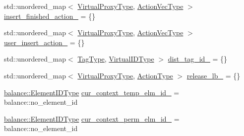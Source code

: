 \begin{DoxyCompactItemize}
\item 
std\+::unordered\+\_\+map$<$ \hyperlink{namespacevt_a1b417dd5d684f045bb58a0ede70045ac}{Virtual\+Proxy\+Type}, \hyperlink{structvt_1_1vrt_1_1collection_1_1_collection_manager_a51650235f0e53ae08381942eba822679}{Action\+Vec\+Type} $>$ \hyperlink{structvt_1_1vrt_1_1collection_1_1_collection_manager_a6d72877052bc73fa06faacb2161cd57d}{insert\+\_\+finished\+\_\+action\+\_\+} = \{\}
\item 
std\+::unordered\+\_\+map$<$ \hyperlink{namespacevt_a1b417dd5d684f045bb58a0ede70045ac}{Virtual\+Proxy\+Type}, \hyperlink{structvt_1_1vrt_1_1collection_1_1_collection_manager_a51650235f0e53ae08381942eba822679}{Action\+Vec\+Type} $>$ \hyperlink{structvt_1_1vrt_1_1collection_1_1_collection_manager_a8d436079bfbadeacdf0584b01c150c29}{user\+\_\+insert\+\_\+action\+\_\+} = \{\}
\item 
std\+::unordered\+\_\+map$<$ \hyperlink{namespacevt_a84ab281dae04a52a4b243d6bf62d0e52}{Tag\+Type}, \hyperlink{namespacevt_1_1vrt_a84d0891f52f70728c3fc2172cffb464b}{Virtual\+I\+D\+Type} $>$ \hyperlink{structvt_1_1vrt_1_1collection_1_1_collection_manager_ac6d4e3a2e80c670dc5c31c0c02ec0e1f}{dist\+\_\+tag\+\_\+id\+\_\+} = \{\}
\item 
std\+::unordered\+\_\+map$<$ \hyperlink{namespacevt_a1b417dd5d684f045bb58a0ede70045ac}{Virtual\+Proxy\+Type}, \hyperlink{namespacevt_ae0a5a7b18cc99d7b732cb4d44f46b0f3}{Action\+Type} $>$ \hyperlink{structvt_1_1vrt_1_1collection_1_1_collection_manager_a42ea6d7733a75f09738a877e90db9aa1}{release\+\_\+lb\+\_\+} = \{\}
\item 
\hyperlink{namespacevt_1_1vrt_1_1collection_1_1balance_a14c8d2c972f2913aa3f1636e5be0a120}{balance\+::\+Element\+I\+D\+Type} \hyperlink{structvt_1_1vrt_1_1collection_1_1_collection_manager_a0ed427a8b00190e291d7ad7cfa4932f1}{cur\+\_\+context\+\_\+temp\+\_\+elm\+\_\+id\+\_\+} = balance\+::no\+\_\+element\+\_\+id
\item 
\hyperlink{namespacevt_1_1vrt_1_1collection_1_1balance_a14c8d2c972f2913aa3f1636e5be0a120}{balance\+::\+Element\+I\+D\+Type} \hyperlink{structvt_1_1vrt_1_1collection_1_1_collection_manager_adbf8f335a30a005a3d5923a96f6f40c9}{cur\+\_\+context\+\_\+perm\+\_\+elm\+\_\+id\+\_\+} = balance\+::no\+\_\+element\+\_\+id
\end{DoxyCompactItemize}
